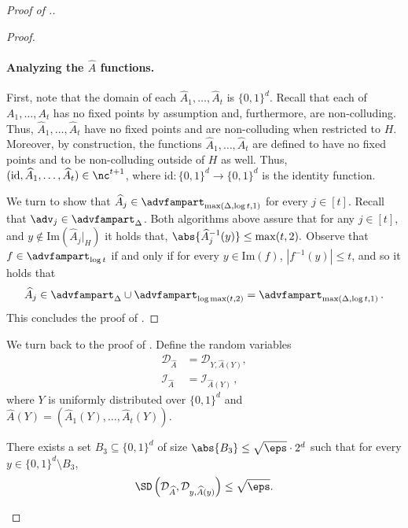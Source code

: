 \begin{proof}[Proof of .]
\begin{proof}
%
\paragraph{Analyzing the $\widehat{A}$ functions.}
First, note that the domain of each $\widehat{A}_1,\ldots,\widehat{A}_t$ is $\{0,1\}^d$. Recall that each of $A_1,\ldots,A_t$ has no fixed points by assumption and, furthermore, are non-colluding. Thus, $\widehat{A}_1,\ldots,\widehat{A}_t$ have no fixed points and are non-colluding when restricted to $H$. Moreover, by construction, the functions $\widehat{A}_1,\ldots,\widehat{A}_t$ are defined to have no fixed points and to be non-colluding outside of $H$ as well. Thus,  $(\mathrm{id},\widehat{A}_1,\ldots,\widehat{A}_t) \in \nc^{t+1}$, where $\mathrm{id} \colon \{0,1\}^d \to \{0,1\}^d$ is the identity function. 

We turn to show that $\widehat{A}_j \in \advfampart_{\max(\Delta, \log t,1)}$ for every $j \in [t]$.  
Recall that $\adv_j \in \advfampart_{\Delta}$. Both algorithms above assure that for any $j\in [t]$, and $y \notin \mathrm{Im}(\widehat{A}_j|_H)$ it holds that, $\abs{\widehat{A}_j^{-1}(y)} \leq \max(t,2).$
Observe that $f \in \advfampart_{\log t}$ if and only if 
for every $y \in \mathrm{Im}(f)$, $|f^{-1}(y)| \le t$,
and so
it holds that
\[
\widehat{A}_j \in \advfampart_{\Delta} \cup \advfampart_{\log \max(t,2)} =\advfampart_{\max(\Delta, \log t,1)}\,.
\]
This concludes the proof of .
\end{proof}

We turn back to the proof of .
%
Define the random variables
\begin{align*}
    \mathcal{D}_{\widehat{A}} &= \mathcal{D}_{Y,\widehat{A}(Y)},\\
    \mathcal{I}_{\widehat{A}} &= \mathcal{I}_{\widehat{A}(Y)}\,,
\end{align*}
where $Y$ is uniformly distributed over $\{0,1\}^d$ and $\widehat{A}(Y) =  (\widehat{A}_1(Y),\ldots,\widehat{A}_t(Y))$.

%

\begin{claim}\label{claim:d is concentrated}
	There exists a set $B_3 \subseteq \{0,1\}^d$ of size $\abs{B_3} \le \sqrt{\eps} \cdot 2^d$ such that for every $y \in \{0,1\}^d \setminus B_3$,
	\[
	\SD\left(\mathcal{D}_{\widehat{A}}, \mathcal{D}_{y,\widehat{A}(y)}\right) \le \sqrt{\eps}.
	\]
\end{claim}


\end{proof}

